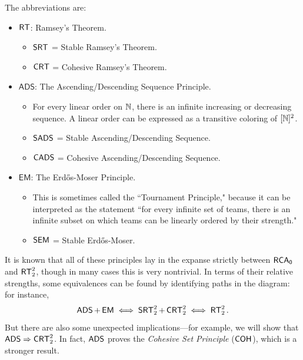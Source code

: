 \documentclass{amsart}
\begin{document}
	\begin{samepage}
		The abbreviations are:
		\begin{itemize}
			\item $\operatorname{\sf{RT}}$: Ramsey's Theorem.
			\begin{itemize}
				\item $\operatorname{\sf{SRT}}$ = Stable Ramsey's Theorem.
				\item $\sf{CRT}$ = Cohesive Ramsey's Theorem.
			\end{itemize}
			\item $\mathsf{ADS}$: The Ascending/Descending Sequence Principle.
			\begin{itemize}
				\item For every linear order on $\mathbb{N}$, there is an infinite increasing or decreasing sequence. A linear order can be expressed as a transitive coloring of $[\mathbb{N}]^2$.
				\item $\operatorname{\sf{SADS}}$ = Stable Ascending/Descending Sequence.
				\item $\sf{CADS}$ = Cohesive Ascending/Descending Sequence.
			\end{itemize}
			\item $\mathsf{EM}$: The Erd\H{o}s-Moser Principle.
			\begin{itemize}
				\item This is sometimes called the ``Tournament Principle," because it can be interpreted as the statement ``for every infinite set of teams, there is an infinite subset on which teams can be linearly ordered by their strength."
				\item $\sf{SEM}$ = Stable Erd\H{o}s-Moser.
			\end{itemize}
		\end{itemize}
	\end{samepage}
	It is known that all of these principles lay in the expanse strictly between $\operatorname{\sf{RCA_0}}$ and $\operatorname{\sf{RT}}^2_2$, though in many cases this is very nontrivial. In terms of their relative strengths, some equivalences can be found by identifying paths in the diagram: for instance,
	$$
	\operatorname{\sf{ADS}} + \operatorname{\sf{EM}} \iff \operatorname{\sf{SRT}}^2_2 + \operatorname{\sf{CRT}}^2_2 \iff \operatorname{\sf{RT}}^2_2.
	$$
	But there are also some unexpected implications---for example, we will show that $\operatorname{\sf{ADS}} \Rightarrow \operatorname{\sf{CRT}}^2_2$. In fact, $\operatorname{\sf{ADS}}$ proves the \textit{Cohesive Set Principle} ($\operatorname{\sf{COH}}$), which is a stronger result. 
	
\end{document}
